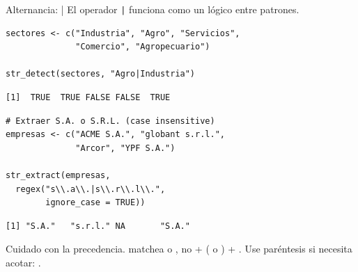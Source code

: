 \documentclass[8pt]{beamer}
\begin{document}
\begin{frame}[fragile]{Alternancia: |}
	El operador \verb`|` funciona como un  lógico entre patrones.
\begin{lstlisting}[style=RScript]
sectores <- c("Industria", "Agro", "Servicios",
              "Comercio", "Agropecuario")

str_detect(sectores, "Agro|Industria")
\end{lstlisting}
\begin{lstlisting}[style=RConsole]
[1]  TRUE  TRUE FALSE FALSE  TRUE
\end{lstlisting}
\begin{lstlisting}[style=RScript]
# Extraer S.A. o S.R.L. (case insensitive)
empresas <- c("ACME S.A.", "globant s.r.l.",
              "Arcor", "YPF S.A.")

str_extract(empresas,
  regex("s\\.a\\.|s\\.r\\.l\\.",
        ignore_case = TRUE))
\end{lstlisting}
\begin{lstlisting}[style=RConsole]
[1] "S.A."   "s.r.l." NA       "S.A."
\end{lstlisting}
	
	\begin{alertblock}{}
		Cuidado con la precedencia.  matchea  o , no  + ( o ) + . Use paréntesis si necesita acotar: .
	\end{alertblock}
\end{frame}
\end{document}
